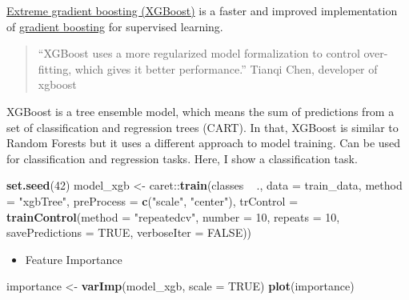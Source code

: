 \documentclass[]{article}
\newenvironment{Shaded}{\begin{snugshade}}{\end{snugshade}}
\newcommand{\KeywordTok}[1]{\textcolor[rgb]{0.13,0.29,0.53}{\textbf{{#1}}}}
\newcommand{\DataTypeTok}[1]{\textcolor[rgb]{0.13,0.29,0.53}{{#1}}}
\newcommand{\DecValTok}[1]{\textcolor[rgb]{0.00,0.00,0.81}{{#1}}}
\newcommand{\StringTok}[1]{\textcolor[rgb]{0.31,0.60,0.02}{{#1}}}
\newcommand{\OtherTok}[1]{\textcolor[rgb]{0.56,0.35,0.01}{{#1}}}
\newcommand{\NormalTok}[1]{{#1}}
\providecommand{\tightlist}{%
  \setlength{\itemsep}{0pt}\setlength{\parskip}{0pt}}
\begin{document}
\href{http://xgboost.readthedocs.io/en/latest/model.html}{Extreme
gradient boosting (XGBoost)} is a faster and improved implementation of
\href{https://en.wikipedia.org/wiki/Gradient_boosting}{gradient
boosting} for supervised learning.

\begin{quote}
``XGBoost uses a more regularized model formalization to control
over-fitting, which gives it better performance.'' Tianqi Chen,
developer of xgboost
\end{quote}

XGBoost is a tree ensemble model, which means the sum of predictions
from a set of classification and regression trees (CART). In that,
XGBoost is similar to Random Forests but it uses a different approach to
model training. Can be used for classification and regression tasks.
Here, I show a classification task.

\begin{Shaded}
\begin{Highlighting}[]
\KeywordTok{set.seed}\NormalTok{(}\DecValTok{42}\NormalTok{)}
\NormalTok{model_xgb <-}\StringTok{ }\NormalTok{caret::}\KeywordTok{train}\NormalTok{(classes ~}\StringTok{ }\NormalTok{.,}
                          \DataTypeTok{data =} \NormalTok{train_data,}
                          \DataTypeTok{method =} \StringTok{"xgbTree"}\NormalTok{,}
                          \DataTypeTok{preProcess =} \KeywordTok{c}\NormalTok{(}\StringTok{"scale"}\NormalTok{, }\StringTok{"center"}\NormalTok{),}
                          \DataTypeTok{trControl =} \KeywordTok{trainControl}\NormalTok{(}\DataTypeTok{method =} \StringTok{"repeatedcv"}\NormalTok{, }
                                                  \DataTypeTok{number =} \DecValTok{10}\NormalTok{, }
                                                  \DataTypeTok{repeats =} \DecValTok{10}\NormalTok{, }
                                                  \DataTypeTok{savePredictions =} \OtherTok{TRUE}\NormalTok{, }
                                                  \DataTypeTok{verboseIter =} \OtherTok{FALSE}\NormalTok{))}
\end{Highlighting}
\end{Shaded}

\begin{itemize}
\tightlist
\item
  Feature Importance
\end{itemize}

\begin{Shaded}
\begin{Highlighting}[]
\NormalTok{importance <-}\StringTok{ }\KeywordTok{varImp}\NormalTok{(model_xgb, }\DataTypeTok{scale =} \OtherTok{TRUE}\NormalTok{)}
\KeywordTok{plot}\NormalTok{(importance)}
\end{Highlighting}
\end{Shaded}
\end{document}
